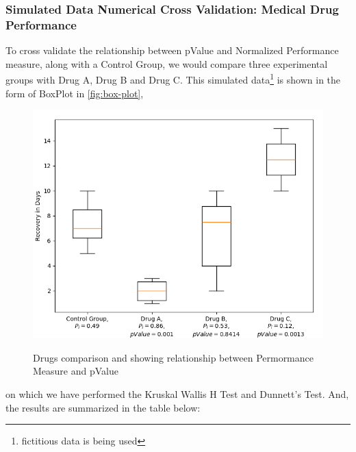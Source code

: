 \documentclass[a4paper,fleqn,review]{cas-sc}
\begin{document}
\subsubsection{Simulated Data Numerical Cross Validation: Medical Drug Performance}
To cross validate the relationship between pValue and Normalized Performance measure, along with a Control Group, we would compare three experimental groups with Drug A, Drug B and Drug C. This simulated data\footnote{fictitious data is being used} is shown in the form of BoxPlot in \autoref{fig:box-plot}, 
\begin{figure}
	\caption{Drugs comparison and showing relationship between Permormance Measure and pValue}
	\centering
	\includegraphics [scale=0.65]{simulation-data-kruskal-dunnett.png}
	\label{fig:box-plot}
\end{figure}
on which we have performed the Kruskal Wallis H Test and Dunnett's Test. And, the results are summarized in the table below:
	
\end{document}
